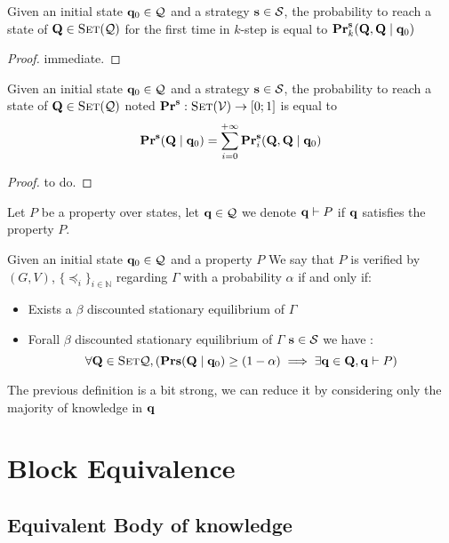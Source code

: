 \begin{mylem}
	Given an initial state $\mathbf{q}_0 \in \mathcal{Q}$ and a strategy $\mathbf{s} \in \mathcal{S}$, the probability to reach a state of $\mathbf{Q} \in \text{\sc Set}(\mathcal{Q})$ for the first time in $k$-step is equal to $\mathbf{Pr}^{\mathbf{s}}_k(\mathbf{Q},\mathbf{Q} \mid \mathbf{q}_0)$
\end{mylem}

\begin{proof}
	immediate.
\end{proof}

\begin{myprop}
	Given an initial state $\mathbf{q}_0 \in \mathcal{Q}$ and a strategy $\mathbf{s} \in \mathcal{S}$, the probability to reach a state of $\mathbf{Q} \in \text{\sc Set}(\mathcal{Q})$ noted  $\mathbf{Pr}^{\mathbf{s}} : \text{\sc Set}(\mathcal{V}) \rightarrow [0;1]$ is equal to $$\mathbf{Pr}^{\mathbf{s}}(\mathbf{Q} \mid \mathbf{q}_0) = \sum_{i=0}^{+\infty}\mathbf{Pr}^{\mathbf{s}}_i(\mathbf{Q},\mathbf{Q} \mid \mathbf{q}_0)$$
\end{myprop}

\begin{proof}
	to do.
\end{proof}

Let $P$ be a property over states, let $\mathbf{q} \in \mathcal{Q}$ we denote $\mathbf{q} \vdash P$ if $\mathbf{q}$ satisfies the property $P$. 

\begin{mydef}
	Given an initial state $\mathbf{q}_0 \in \mathcal{Q}$ and a property $P$ We say that $P$ is verified by $(G,V)$, $\{ \preceq_i\}_{i \in \mathbb{N}}$ regarding $\Gamma$ with a probability $\alpha$ if and only if:
	\begin{itemize}
		\item Exists a $\beta$ discounted stationary equilibrium of $\Gamma$ \\
		\item Forall $\beta$ discounted stationary equilibrium of $\Gamma$ $\mathbf{s} \in \mathcal{S} $ we have : $$ \forall \mathbf{Q} \in \text{\sc Set}{\mathcal{Q}}, (\mathbf{Pr}{\mathbf{s}}(\mathbf{Q} \mid \mathbf{q}_0)\geq(1-\alpha) \implies \exists \mathbf{q} \in \mathbf{Q},  \mathbf{q} \vdash P)$$
	\end{itemize}
\end{mydef}
The previous definition is a bit strong, we can reduce it by considering only the majority of knowledge in $\mathbf{q}$


\section{Block Equivalence}

\subsection{Equivalent Body of knowledge}

